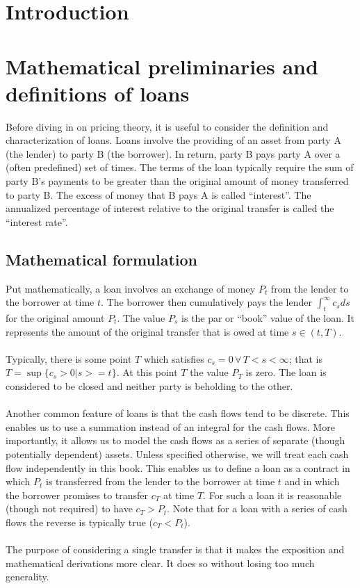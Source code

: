 \documentclass{article}
\theoremstyle{definition}
\begin{document}


\section{Introduction}



\section{Mathematical preliminaries and definitions of loans}
Before diving in on pricing theory, it is useful to consider the definition and characterization of loans.  Loans involve the providing of an asset from party A (the lender) to party B (the borrower).  In return, party B pays party A over a (often predefined) set of times.  The terms of the loan typically require the sum of party B's payments to be greater than the original amount of money transferred to party B.  The excess of money that B pays A is called ``interest''.  The annualized percentage of interest relative to the original transfer is called the ``interest rate''.  

\subsection{Mathematical formulation}
Put mathematically, a loan involves an exchange of money \(P_t\) from the lender to the borrower at time \(t\).  The borrower then cumulatively pays the lender \(\int_t ^ \infty c_s ds\) for the original amount \(P_t\).  The value \(P_s\) is the par or ``book'' value of the loan.  It represents the amount of the original transfer that is owed at time \(s \in (t, T)\).
\\
\\
Typically, there is some point \(T\) which satisfies \(c_s=0\, \forall\, T<s<\infty\); that is \(T= \sup\{c_s>0 | s>=t\} \).  At this point \(T\) the value \(P_T\) is zero.  The loan is considered to be closed and neither party is beholding to the other.  
\\
\\
Another common feature of loans is that the cash flows tend to be discrete.  This enables us to use a summation instead of an integral for the cash flows.  More importantly, it allows us to model the cash flows as a series of separate (though potentially dependent) assets.  Unless specified otherwise, we will treat each cash flow independently in this book.  This enables us to define a loan as a contract in which \(P_t\) is transferred from the lender to the borrower at time \(t\) and in which the borrower promises to transfer \(c_T\) at time \(T\). For such a loan it is reasonable (though not required) to have \(c_T>P_t\).  Note that for a loan with a series of cash flows the reverse is typically true (\(c_T<P_t\)).  
\\
\\
The purpose of considering a single transfer is that it makes the exposition and mathematical derivations more clear.  It does so without losing too much generality. 
\end{document}
